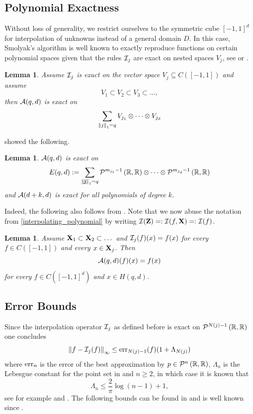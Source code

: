 \documentclass[12pt, oneside]{amsart}
\newtheorem{lem}[thm]{Lemma}
\theoremstyle{definition}
\theoremstyle{remark}
\numberwithin{equation}{section}
\begin{document}
\subsection{Polynomial Exactness}
Without loss of generality, we restrict ourselves to the symmetric cube \([-1, 
1]^d\)  for 
interpolation of unknowns instead of a general domain \(D\). In this case, 
Smolyak's algorithm is well known to exactly reproduce functions on certain 
polynomial spaces given that the rules \(\cI_j\) are exact on nested spaces 
\(V_j\), see \cite{DELVOS198299} or \cite{novakRitter1996}.
\begin{lem}
	Assume \(\cI_j\) is exact on the vector space \(V_j \subseteq C([-1, 1])\) 
	and assume \[
	V_1 \subset V_2 \subset V_3 \subset \dots,
	\]
	then \(\cA(q, d)\) is exact on \[
	\sum_{\norm[1]{j}=q} V_{j_1} \otimes \cdots \otimes V_{j_d}
	\]
\end{lem}
\cite{BarthelmannHighDim_2000} showed the following. 
\begin{lem}
	\(\cA(q, d)\) is exact on \[
	E(q, d) \defn \sum_{\norm[1]{\bfj} = q} \pols[m_{j_1}-1]{\R, \R} \otimes 
	\cdots \otimes \pols[m_{j_d}-1]{\R, \R}
	\]
	and \(\cA(d+k, d)\) is exact for all polynomials of degree \(k\).
\end{lem}
Indeed, the following also follows from \cite{BarthelmannHighDim_2000}. Note 
that we now abuse the notation from \ref{interpolating_polynomial} by writing 
\(\cI(\ZZ) \revdefn \cI(f, \XX) \revdefn \cI(f)\).
\begin{lem}
	Assume \(\XX_1 \subset \XX_2 \subset \dots\) and \(\cI_j(f)(x) = f(x)\) for 
	every \(f \in C([-1, 1])\) and every \(x \in \XX_j\). Then \[
	\cA(q, d)(f)(x) = f(x)
	\]
	for every \(f \in C([-1, 1]^d)\) and \(x \in H(q, d)\).
\end{lem}

\subsection{Error Bounds}
Since the interpolation operator \(\cI_j\) as defined before is exact on 
\(\pols[N(j)-1]{\R, \R}\) one concludes \[
\norm[\infty]{f - \cI_j(f)} \leq \err_{N(j)-1}(f)(1+\Lambda_{N(j)})
\]
where \(\err_n\) is the error of the best approximation by \(p \in \pols[n]{\R, 
\R}\), \(\Lambda_n\) is the Lebesgue constant for the point set in 
 and \(n \geq 2\), in which case it is known that \[
\Lambda_n \leq \frac{2}{\pi} \log(n-1)+1,
\]
see for example \cite{zeller1966} and \cite{Dzjadyk1983}. The following bounds 
can be found in \cite{BarthelmannHighDim_2000} and is well known since 
\cite{smolyak1963, temlyakov1986, WASILKOWSKI19951}.
\end{document}
